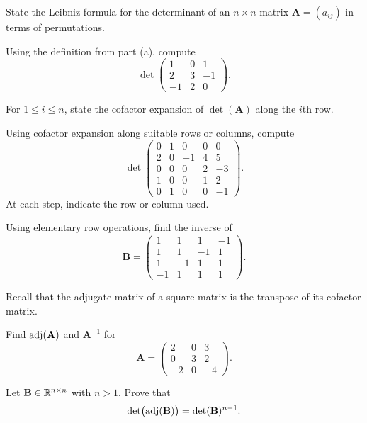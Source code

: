 \documentclass[11pt,oneside]{article}
\begin{document}
\begin{problem}
\begin{problemsubparts}
\item State the Leibniz formula for the determinant of an $n\times n$ matrix $\mathbf A=(a_{ij})$ in terms of permutations.
\item Using the definition from part \textup{(a)}, compute
\[
\det\begin{pmatrix}
1&0&1\\
2&3&-1\\
-1&2&0
\end{pmatrix}.
\]
\item For $1\le i\le n$, state the cofactor expansion of $\det(\mathbf A)$ along the $i$th row.
\item Using cofactor expansion along suitable rows or columns, compute
\[
\det\begin{pmatrix}
0&1&0&0&0\\
2&0&-1&4&5\\
0&0&0&2&-3\\
1&0&0&1&2\\
0&1&0&0&-1
\end{pmatrix}.
\]
At each step, indicate the row or column used.
\item Using elementary row operations, find the inverse of
\[
\mathbf B=
\begin{pmatrix}
1&1&1&-1\\
1&1&-1&1\\
1&-1&1&1\\
-1&1&1&1
\end{pmatrix}.
\]
\end{problemsubparts}
\end{problem}

\begin{problem}
Recall that the adjugate matrix of a square matrix is the transpose of its cofactor matrix.
\begin{problemsubparts}
\item Find $\operatorname{adj}(\mathbf A)$ and $\mathbf A^{-1}$ for
\[
\mathbf A=
\begin{pmatrix}
2&0&3\\
0&3&2\\
-2&0&-4
\end{pmatrix}.
\]
\item Let $\mathbf B\in\mathbb{R}^{n\times n}$ with $n>1$. Prove that
\[
\det\bigl(\operatorname{adj}(\mathbf B)\bigr)=\det(\mathbf B)^{n-1}.
\]
\end{problemsubparts}
\end{problem}
\end{document}
